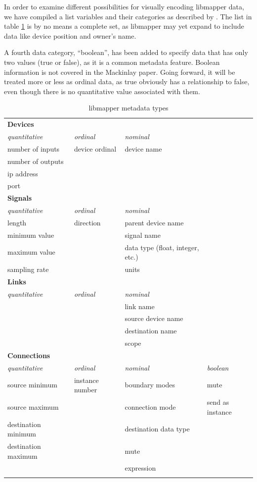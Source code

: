 In order to examine different possibilities for visually encoding libmapper data, we have compiled a list variables and their categories as described by . The list in table \ref{tab:metadata_types} is by no means a complete set, as libmapper may yet expand to include data like device position and owner's name.

A fourth data category, ``boolean'', has been added to specify data that has only two values (true or false), as it is a common metadata feature. Boolean information is not covered in the Mackinlay paper. Going forward, it will be treated more or less as ordinal data, as true obviously has a relationship to false, even though there is no quantitative value associated with them.

\newpage

\begin{longtable}{l l p{4cm} l}
\caption[libmapper metadata types]{libmapper metadata types} \label{tab:metadata_types} \\

	\hline\hline
	\textbf{Devices} & & \\
	\emph{quantitative} & \emph{ordinal} & \emph{nominal}\\
	\hline
	number of inputs & device ordinal & device name\\
		number of outputs \\
	ip address \\
	port \\ [0.7cm]

	\hline\hline
	\textbf{Signals} & & \\
	\emph{quantitative} & \emph{ordinal} & \emph{nominal}\\
	\hline
	length & direction & parent device name\\
	minimum value & & signal name \\
	maximum value & & data type (float, integer, etc.)\\
	sampling rate & & units \\ [0.7cm]

	\hline\hline
	\textbf{Links} & & \\
	\emph{quantitative} & \emph{ordinal} & \emph{nominal}\\
	\hline
	& & link name \\
	& & source device name \\
	& & destination name \\
	& & scope \\ [0.7cm]

	\hline\hline
	\textbf{Connections} & & \\
	\emph{quantitative} & \emph{ordinal} & \emph{nominal} & \emph{boolean}\\
	\hline
	source minimum & instance number & boundary modes & mute\\
	source maximum & & connection mode & send as instance\\
	destination minimum & & destination data type \\
	destination maximum & & mute \\
	& & expression \\
	& & \\
\end{longtable}


